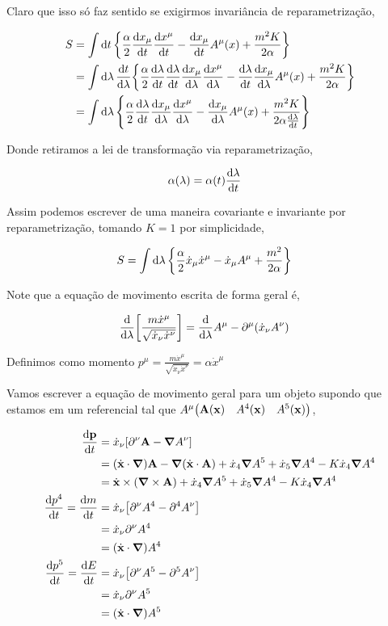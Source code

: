 \documentclass[twoside]{amsart}
\numberwithin{equation}{section}
\begin{document}
Claro que isso só faz sentido se exigirmos invariância de reparametrização,

\begin{align*}
    S&=\int\dd{t}\qty{\frac\alpha 2\dv{x_\mu}{t}\dv{x^\mu}{t}-\dv{x_\mu}{t}A^\mu\qty(x)+\frac{m^2K}{2\alpha}}\\
    &=\int\dd{\lambda}\dv{t}{\lambda}\qty{\frac\alpha 2\dv{\lambda}{t}\dv{\lambda}{t}\dv{x_\mu}{\lambda}\dv{x^\mu}{\lambda}-\dv{\lambda}{t}\dv{x_\mu}{\lambda}A^\mu\qty(x)+\frac{m^2K}{2\alpha}}\\
    &=\int\dd{\lambda}\qty{\frac\alpha 2\dv{\lambda}{t}\dv{x_\mu}{\lambda}\dv{x^\mu}{\lambda}-\dv{x_\mu}{\lambda}A^\mu\qty(x)+\frac{m^2K}{2\alpha\dv{\lambda}{t}}}\\
\end{align*}

Donde retiramos a lei de transformação via reparametrização,

\begin{align}
    \alpha\qty(\lambda)&=\alpha\qty(t)\dv{\lambda}{t}
\end{align}

Assim podemos escrever de uma maneira covariante e invariante por reparametrização, tomando $K=1$ por simplicidade,

\begin{align}
    S&=\int\dd{\lambda}\qty{\frac\alpha 2\dot{x}_\mu\dot{x}^\mu-\dot{x}_\mu A^\mu+\frac{m^2}{2\alpha}}
\end{align}

Note que a equação de movimento escrita de forma geral é,

\begin{align}
    \dv{}{\lambda}\qty[\frac{m\dot {x}^\mu}{\sqrt{\dot x_\nu\dot x^\nu}}]&=\dv{}{\lambda}A^\mu-\partial^\mu\qty(\dot x_\nu A^\nu)
\end{align}

Definimos como momento $p^\mu=\frac{m\dot {x}^\mu}{\sqrt{\dot x_\nu\dot x^\nu}}=\alpha \dot x^\mu$

Vamos escrever a equação de movimento geral para um objeto supondo que estamos em um referencial tal que $A^\mu\mqty(\vb A\qty(\vb x)&A^4\qty(\vb x)&A^5\qty(\vb x))$,

\begin{align}
    \dv{\vb p}{t}&=\dot x_\nu\qty[\partial^\nu \vb A-\grad A^\nu]\\
    &=\qty(\dot {\vb x}\cdot\grad)\vb A-\grad\qty(\dot{\vb x}\cdot\vb A)+\dot x_4\grad A^5+\dot x_5\grad A^4-K\dot x_4\grad A^4\\
    &=\dot{\vb x}\times\qty(\grad\times \vb A)+\dot x_4\grad A^5+\dot x_5\grad A^4-K\dot x_4\grad A^4\\
    \dv{p^4}{t}=\dv{m}{t}&=\dot x_\nu\qty[\partial^\nu A^4-\partial^4A^\nu]\\
    &=\dot x_\nu\partial^\nu A^4\\
    &=\qty(\dot {\vb x}\cdot\grad )A^4\\
    \dv{p^5}{t}=\dv{E}{t}&=\dot x_\nu\qty[\partial^\nu  A^5-\partial^5 A^\nu]\\
    &=\dot x_\nu\partial^\nu  A^5\\
    &=\qty(\dot {\vb x}\cdot \grad)  A^5
\end{align}
\end{document}
